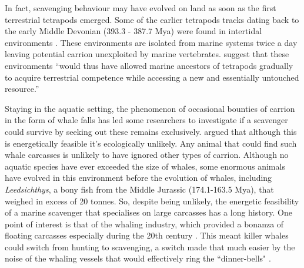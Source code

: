 \documentclass[a4paper,12pt]{article}
\begin{document}
In fact, scavenging behaviour may have evolved on land as soon as the first terrestrial tetrapods emerged.
Some of the earlier tetrapods tracks dating back to the early Middle Devonian (393.3 - 387.7 Mya) were found in intertidal environments \citep{Niedzwiedzki2009}.
These environments are isolated from marine systems twice a day leaving potential carrion unexploited by marine vertebrates.
\cite{Niedzwiedzki2009} suggest that these environments ``would thus have allowed marine ancestors of tetrapods gradually to acquire terrestrial competence while accessing a new and essentially untouched resource.''


Staying in the aquatic setting, the phenomenon of occasional bounties of carrion in the form of whale falls has led some researchers to investigate if a scavenger could survive by seeking out these remains exclusively.
\cite{ruxton2005searching} argued that although this is energetically feasible it's ecologically unlikely.
Any animal that could find such whale carcasses is unlikely to have ignored other types of carrion.
Although no aquatic species have ever exceeded the size of whales, some enormous animals have evolved in this environment before the evolution of whales, including \textit{Leedsichthys}, a bony fish from the Middle Jurassic (174.1-163.5 Mya), that weighed in excess of 20 tonnes.
So, despite being unlikely, the energetic feasibility of a marine scavenger that specialises on large carcasses has a long history.
One point of interest is that of the whaling industry, which provided a bonanza of floating carcasses especially during the 20th century \citep{Whitehead415}.
This meant killer whales could switch from hunting to scavenging, a switch made that much easier by the noise of the whaling vessels that would effectively ring the ``dinner-bells" \citep{Whitehead415}.
\end{document}
